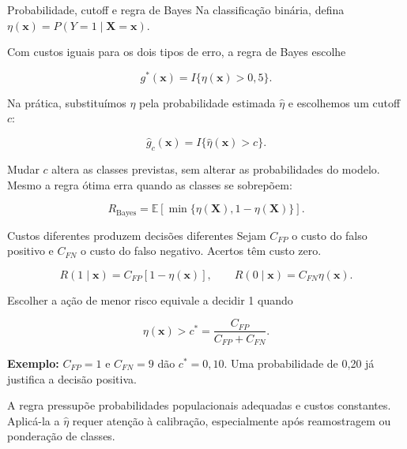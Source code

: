 \documentclass[
  10pt,
  ignorenonframetext,
  aspectratio=169,
  brazilian,
]{beamer}
\begin{document}
\begin{frame}{Probabilidade, cutoff e regra de Bayes}
\protect{}\label{probabilidade-cutoff-e-regra-de-bayes}
Na classificação binária, defina
\(\eta(\mathbf x)=P(Y=1\mid\mathbf X=\mathbf x)\).

Com custos iguais para os dois tipos de erro, a regra de Bayes escolhe

\[
g^*(\mathbf x)=I\{\eta(\mathbf x)>0{,}5\}.
\]

Na prática, substituímos \(\eta\) pela probabilidade estimada
\(\hat\eta\) e escolhemos um cutoff \(c\):

\[
\hat g_c(\mathbf x)=I\{\hat\eta(\mathbf x)>c\}.
\]

Mudar \(c\) altera as classes previstas, sem alterar as probabilidades
do modelo. Mesmo a regra ótima erra quando as classes se sobrepõem:

\[
R_{\mathrm{Bayes}}=\mathbb E[\min\{\eta(\mathbf X),1-\eta(\mathbf X)\}].
\]
\end{frame}

\begin{frame}{Custos diferentes produzem decisões diferentes}
\protect{}\label{custos-diferentes-produzem-decisuxf5es-diferentes}
Sejam \(C_{FP}\) o custo do falso positivo e \(C_{FN}\) o custo do falso
negativo. Acertos têm custo zero.

\[
R(1\mid\mathbf x)=C_{FP}[1-\eta(\mathbf x)],
\qquad R(0\mid\mathbf x)=C_{FN}\eta(\mathbf x).
\]

Escolher a ação de menor risco equivale a decidir 1 quando

\[
\boxed{\eta(\mathbf x)>c^*=\frac{C_{FP}}{C_{FP}+C_{FN}}.}
\]

\textbf{Exemplo:} \(C_{FP}=1\) e \(C_{FN}=9\) dão \(c^*=0{,}10\). Uma
probabilidade de 0,20 já justifica a decisão positiva.

A regra pressupõe probabilidades populacionais adequadas e custos
constantes. Aplicá-la a \(\hat\eta\) requer atenção à calibração,
especialmente após reamostragem ou ponderação de classes.
\end{frame}
\end{document}
